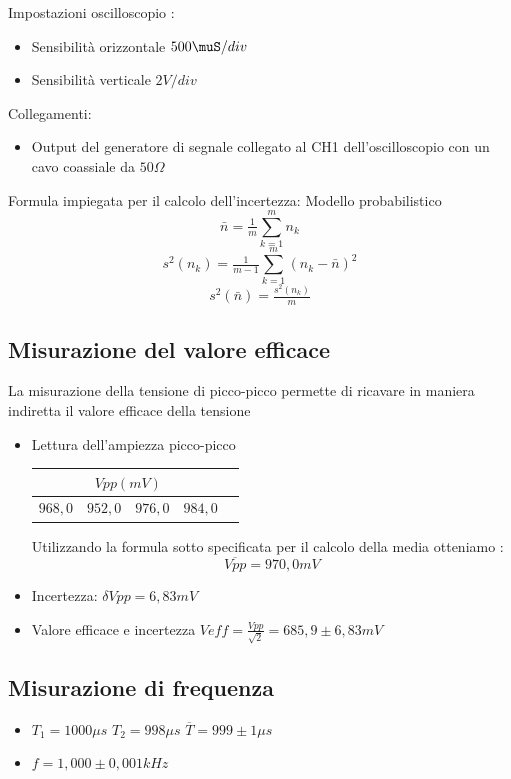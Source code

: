 \documentclass[a4paper]{article}
\begin{document}
Impostazioni oscilloscopio :
\begin{itemize}
\item Sensibilità orizzontale \(500 \muS/div \)
\item Sensibilità verticale \(2 V/div\)
\end{itemize}

Collegamenti:
\begin{itemize}
\item Output del generatore di segnale collegato al CH1 dell'oscilloscopio con un cavo coassiale da \(50 \Omega\)  
\end{itemize}

Formula impiegata per il calcolo dell’incertezza: Modello probabilistico \[\bar{n} = \tfrac{1}{m}\sum_{k=1}^m n_k \]
\[s^2 (n_k)= \tfrac{1}{m-1}\sum_{k=1}^m (n_k - \bar{n})^2 \] 
\[s^2 (\bar{n}) = \tfrac{s^2 (n_k)}{m}\]

\subsection{Misurazione del valore efficace}

La misurazione della tensione di picco-picco permette di ricavare in maniera indiretta il valore efficace della tensione
\begin{itemize}
\item Lettura dell’ampiezza picco-picco \\ 
    \begin{tabular}{|r|l|l|l|l|}
     \hline
     \multicolumn{4}{|c|}{\(Vpp (mV)\)} \\
     \hline
     \(968,0\) & \(952,0\) & \(976,0\) & \(984,0\) \\
     \hline
   \end{tabular}
Utilizzando la formula sotto specificata per il calcolo della media otteniamo :
\[\overline{Vpp}= 970,0 mV\]
\item Incertezza: \(\delta{}  Vpp= 6,83 mV\)
\item Valore efficace e incertezza \(Veff= \tfrac{Vpp}{\sqrt{2}} = 685,9 \pm 6,83 mV \)
\end{itemize}

\subsection{Misurazione di frequenza}
\begin{itemize}
\item \(T_1 = 1000 \mu s\) \(T_2 = 998 \mu s\) \(\overline{T} = 999 \pm 1 \mu s\)
\item \(f= 1,000 \pm 0,001 kHz\)
\end{itemize}
\end{document}
